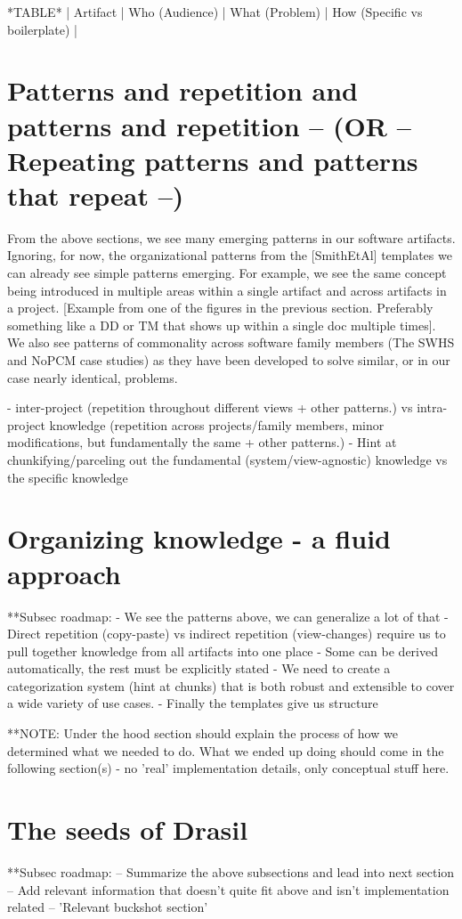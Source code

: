 *TABLE*
| Artifact | Who (Audience) | What (Problem) | How (Specific vs boilerplate) |

\section{Patterns and repetition and patterns and repetition -- (OR -- Repeating patterns and patterns that repeat --)}
From the above sections, we see many emerging patterns in our software
artifacts. Ignoring, for now, the organizational patterns from the [SmithEtAl]
templates we can already see simple patterns emerging. For example, we see the
same concept being introduced in multiple areas within a single artifact and
across artifacts in a project. [Example from one of the figures in the previous
section. Preferably something like a DD or TM that shows up within a single doc
multiple times]. We also see patterns of commonality across software family
members (The SWHS and NoPCM case studies) as they have been developed to solve
similar, or in our case nearly identical, problems.

- inter-project (repetition throughout different views + other patterns.)
  vs intra-project knowledge (repetition across projects/family members,
  minor modifications, but fundamentally the same + other patterns.)
- Hint at chunkifying/parceling out the fundamental (system/view-agnostic)
knowledge vs the specific knowledge

\section{Organizing knowledge - a fluid approach}
  **Subsec roadmap:
    - We see the patterns above, we can generalize a lot of that
    - Direct repetition (copy-paste) vs indirect repetition (view-changes)
    require us to pull together knowledge from all artifacts into one place
    - Some can be derived automatically, the rest must be explicitly stated
    - We need to create a categorization system (hint at chunks) that is both
    robust and extensible to cover a wide variety of use cases.
    - Finally the templates give us structure

  **NOTE: Under the hood section should explain the process of how we determined
  what we needed to do. What we ended up doing should come in the following
  section(s) - no 'real' implementation details, only conceptual stuff here.
  
\section{The seeds of Drasil}
  **Subsec roadmap:
    -- Summarize the above subsections and lead into next section
    -- Add relevant information that doesn't quite fit above 
      and isn't implementation related
    -- 'Relevant buckshot section'